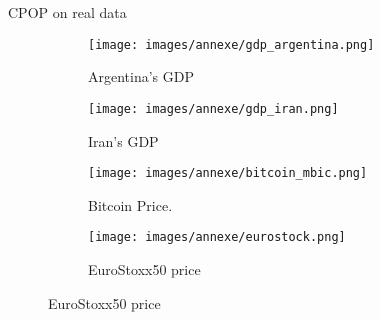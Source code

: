\documentclass[10pt, xcolor=dvipsnames]{beamer}
\begin{document}
\begin{frame}{CPOP on real data}



\begin{figure}[htbp]
    \centering
    \begin{subfigure}{0.45\textwidth}
        \centering
        \texttt{[image: images/annexe/gdp\_argentina.png]}
        \caption{Argentina's GDP}
        \label{fig:subfig1}
    \end{subfigure}
    \hfill
    \begin{subfigure}{0.45\textwidth}
        \centering
        \texttt{[image: images/annexe/gdp\_iran.png]}
        \caption{Iran's GDP}
        \label{fig:subfig2}
    \end{subfigure}

    \vspace{0.5cm} %

    \begin{subfigure}{0.45\textwidth}
        \centering
        \texttt{[image: images/annexe/bitcoin\_mbic.png]}
        \caption{Bitcoin Price.}
        \label{fig:subfig3}
    \end{subfigure}
    \hfill
    \begin{subfigure}{0.45\textwidth}
        \centering
        \texttt{[image: images/annexe/eurostock.png]}
        \caption{EuroStoxx50 price}
        \label{fig:subfig4}
    \end{subfigure}

    \label{fig:gridfigure}
\end{figure}

\end{frame}
\end{document}

